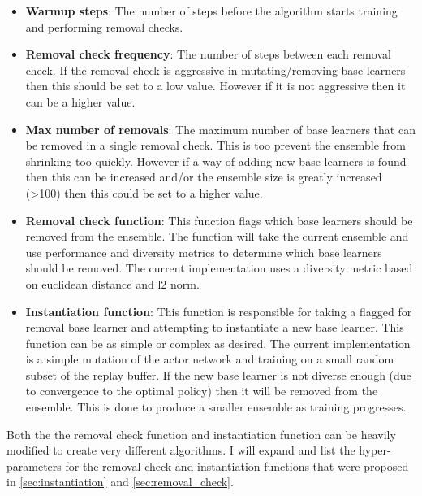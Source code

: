 \begin{itemize}
    \item \textbf{Warmup steps}: The number of steps before the algorithm starts training and performing removal checks.
    \item \textbf{Removal check frequency}: The number of steps between each removal check. If the removal check is aggressive in mutating/removing base learners then this should be set to a low value. However if it is not aggressive then it can be a higher value.
    \item \textbf{Max number of removals}: The maximum number of base learners that can be removed in a single removal check. This is too prevent the ensemble from shrinking too quickly. However if a way of adding new base learners is found then this can be increased and/or the ensemble size is greatly increased (>100) then this could be set to a higher value.
    \item \textbf{Removal check function}: This function flags which base learners should be removed from the ensemble. The function will take the current ensemble and use performance and diversity metrics to determine which base learners should be removed. The current implementation uses a diversity metric based on euclidean distance and l2 norm.
    \item \textbf{Instantiation function}: This function is responsible for taking a flagged for removal base learner and attempting to instantiate a new base learner. This function can be as simple or complex as desired. The current implementation is a simple mutation of the actor network and training on a small random subset of the replay buffer. If the new base learner is not diverse enough (due to convergence to the optimal policy) then it will be removed from the ensemble. This is done to produce a smaller ensemble as training progresses.
\end{itemize}

Both the the removal check function and instantiation function can be heavily modified to create very different algorithms. I will expand and list the hyper-parameters for the removal check and instantiation functions that were proposed in \ref{sec:instantiation} and \ref{sec:removal_check}. 

